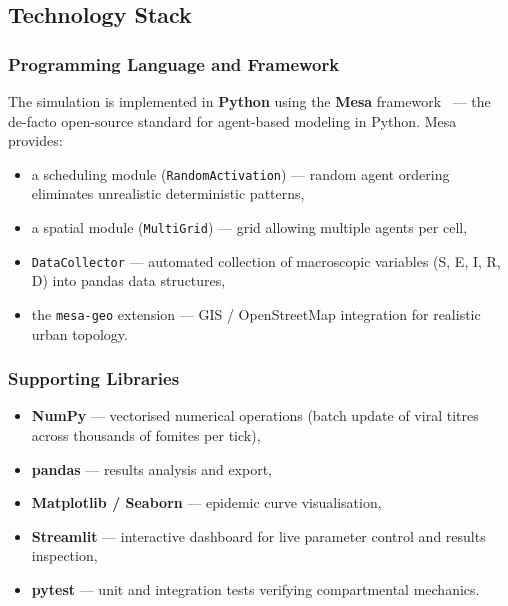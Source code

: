 \documentclass[english]{projectreport}
\begin{document}
\subsection{Technology Stack}
\label{sec:tech-stack}

\subsubsection{Programming Language and Framework}
\label{sec:mesa}

The simulation is implemented in \textbf{Python} using the \textbf{Mesa}
framework~\cite{mesa2020} --- the de-facto open-source standard for agent-based
modeling in Python. Mesa provides:

\begin{itemize}
  \item a scheduling module (\texttt{RandomActivation}) --- random agent
        ordering eliminates unrealistic deterministic patterns,
  \item a spatial module (\texttt{MultiGrid}) --- grid allowing multiple agents
        per cell,
  \item \texttt{DataCollector} --- automated collection of macroscopic
        variables (S, E, I, R, D) into pandas data structures,
  \item the \texttt{mesa-geo} extension --- GIS / OpenStreetMap integration
        for realistic urban topology.
\end{itemize}

\subsubsection{Supporting Libraries}
\label{sec:libraries}

\begin{itemize}
  \item \textbf{NumPy} --- vectorised numerical operations (batch update of
        viral titres across thousands of fomites per tick),
  \item \textbf{pandas} --- results analysis and export,
  \item \textbf{Matplotlib / Seaborn} --- epidemic curve visualisation,
  \item \textbf{Streamlit} --- interactive dashboard for live parameter control
        and results inspection,
  \item \textbf{pytest} --- unit and integration tests verifying compartmental
        mechanics.
\end{itemize}
\end{document}
